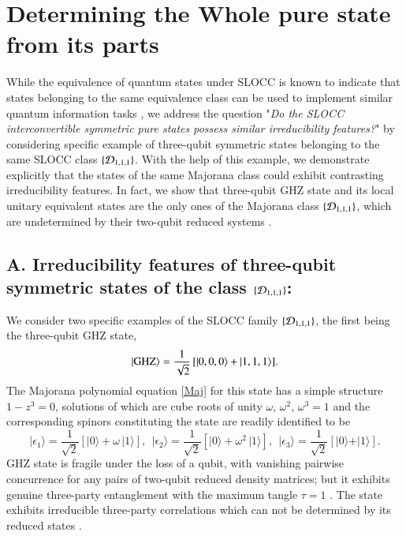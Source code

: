   
\section{Determining the Whole pure state from its parts}\label{chap29-eqIV} 

While the equivalence of quantum states under SLOCC is known to indicate that states belonging to the same equivalence class can be used to implement similar quantum information tasks \cite{Dur}, we address the question "{\emph{Do the {\rm SLOCC} interconvertible symmetric pure states possess similar irreducibility features?}}" by considering specific example of three-qubit symmetric states belonging to the same SLOCC class $\{{\cal D}_{1,1,1}\}$.  With the help of this example, we demonstrate explicitly that the states of the same Majorana class could exhibit contrasting irreducibility features. In fact, we show that three-qubit GHZ state and its local unitary equivalent states are the only ones of the Majorana class $\{{\cal D}_{1,1,1}\}$,  which are undetermined by their two-qubit reduced systems \cite{SP1,Walck,Walck2}. 

\subsection*{A. Irreducibility features of three-qubit symmetric states of the class $\{{\cal D}_{1,1,1} \}$:}

We consider two specific examples of the SLOCC family $\{{\cal D}_{1,1,1}\}$,  the first being the three-qubit 
GHZ state,  
\begin{equation}
\vert {\rm GHZ}\rangle= \frac{1}{\sqrt{2}}\, [\vert 0,0,0\rangle +  \vert 1,1,1\rangle].\label{GHZ}
\end{equation}      
The Majorana polynomial equation \eqref{Maj} for this state has a simple structure $1-z^3=0$, solutions of which are cube roots of unity $\omega$, $\omega^2$, $\omega^3=1$ and the corresponding spinors constituting the state are readily identified to be 
\begin{equation}
\vert \epsilon_1\rangle =\frac{1}{\sqrt{2}}[\vert 0\rangle+\omega\, \vert 1\rangle],\ \  \vert \epsilon_2\rangle =\frac{1}{\sqrt{2}}[\vert 0\rangle+\omega^2\, \vert 1\rangle], \ \ \vert \epsilon_3\rangle =\frac{1}{\sqrt{2}}[\vert 0\rangle+ \vert 1\rangle].\label{chap29-eq16}
\end{equation}
GHZ state is fragile under the loss of a qubit, with vanishing pairwise concurrence \cite{Wot,Wot2} for any pairs of two-qubit reduced density matrices; but it exhibits genuine three-party entanglement \cite{Dur,RaRe} with the maximum tangle  $\tau=1$ \cite{Kun}.  The state exhibits irreducible three-party correlations which can not be determined by its reduced states \cite{SP1,Walck,Walck2}. 

